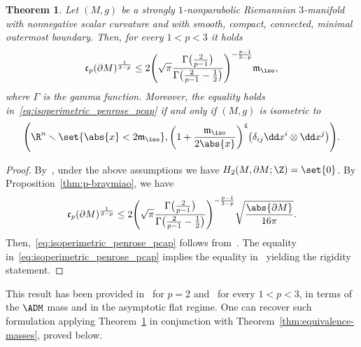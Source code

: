 \documentclass[10pt,a4paper]{amsart}
\numberwithin{equation}{section}
\newtheorem{Theorem}{Theorem}[section]
\renewcommand{\ncapa}{\mathfrak{c}}
\newcommand{\eum}{\delta}
\newcommand{\ma}{\mathfrak{m}}
\begin{document}
\begin{Theorem}\label{thm:sharp-p-penrose}
 Let $(M,g)$ be a strongly $1$-nonparabolic Riemannian $3$-manifold with nonnegative scalar curvature and with smooth, compact, connected, minimal outermost boundary. Then, for every $1<p<3$ it holds
 \begin{equation}\label{eq:isoperimetric_penrose_pcap}
 \ncapa_p(\partial M)^{\frac{1}{3-p}}\leq 2\Bigg(\sqrt{\pi}\frac{\Gamma\big(\frac{2}{p-1}\big)}{\Gamma\big(\frac{2}{p-1}-\frac{1}{2}\big)}\Bigg)^{-\frac{p-1}{3-p}} \ma_{\iso},
 \end{equation}
 where $\Gamma$ is the gamma function. Moreover, the equality holds in~\eqref{eq:isoperimetric_penrose_pcap} if and only if $(M,g)$ is isometric to
 \[
 \Bigg(\R^n\smallsetminus \set{ \abs{x} < 2 \ma_{\iso}}, \bigg( 1+ \frac{ \ma_{\iso}}{2 \abs{x}}\bigg)^4\big(\eum_{ij}\dd x^i \otimes \dd x^j\big)\Bigg).
 \]
\end{Theorem}

\begin{proof} By~\cite[Lemma 2.8]{benatti_isoperimetricriemannianpenroseinequality_2022}, under the above assumptions we have $H_2(M, \partial M; \Z) = \set{0}$. By Proposition~\ref{thm:p-braymiao}, we have
\[
 \ncapa_p(\partial M )^{\frac{1}{3-p}}\leq 2\Bigg(\sqrt{\pi}\frac{\Gamma\big(\frac{2}{p-1}\big)}{\Gamma\big(\frac{2}{p-1}-\frac{1}{2}\big)}\Bigg)^{-\frac{p-1}{3-p}} \sqrt{\frac{\abs{\partial M}}{16 \pi}}.
\]
Then,~\eqref{eq:isoperimetric_penrose_pcap} follows from~\cite[Theorem 1.3]{benatti_isoperimetricriemannianpenroseinequality_2022}. The equality in~\eqref{eq:isoperimetric_penrose_pcap} implies the equality in~\cite[Theorem 1.3]{benatti_isoperimetricriemannianpenroseinequality_2022} yielding the rigidity statement. \end{proof}

This result has been provided in~\cite[Theorem 4]{bray_capacitysurfacesmanifoldsnonnegative_2008} for $p=2$ and~\cite[Theorem 1.1]{xiao_harmoniccapacityasymptoticallyflat_2016} for every $1<p<3$, in terms of the $\ADM$ mass and in the asymptotic flat regime. One can recover such formulation applying Theorem~\ref{thm:sharp-p-penrose} in conjunction with Theorem~\ref{thm:equivalence-masses}, proved below.
\end{document}
